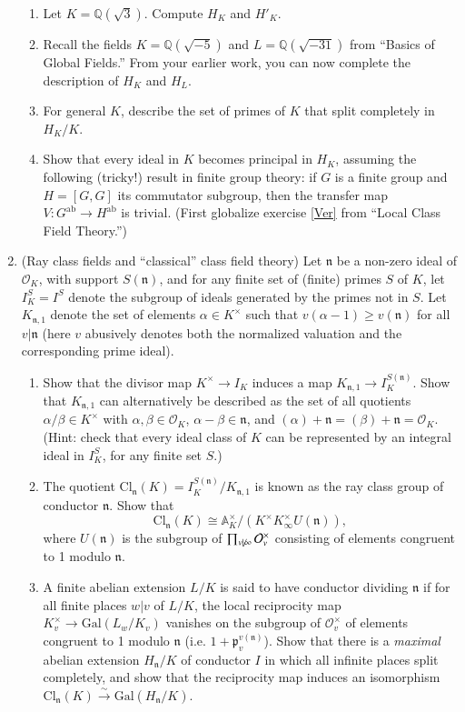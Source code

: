\documentclass[11pt,answers,addpoints,reqno]{exam}
\theoremstyle{definition}
\theoremstyle{remark}
\theoremstyle{definition}
\theoremstyle{remark}
\theoremstyle{remark}
\theoremstyle{remark}
\newcommand{\Q}{\mathbb{Q}}
\newcommand{\Gal}{\mathrm{Gal}} %
\newcommand{\mc}{\mathcal}
\newcommand{\mf}{\mathfrak}
\newcommand{\mr}{\mathrm}
\begin{document}
\begin{enumerate}
\begin{enumerate}
\item Let $K= \Q(\sqrt{3})$. Compute $H_K$ and $H'_K$.
\item Recall the fields $K= \Q(\sqrt{-5})$ and $L= \Q(\sqrt{-31})$ from ``Basics of Global Fields.'' From your earlier work, you can now complete the description of $H_K$ and $H_L$.
\item For general $K$, describe the set of primes of $K$ that split completely in $H_K/K$.
\item Show that every ideal in $K$ becomes principal in $H_K$, assuming the following (tricky!) result in finite group theory: if $G$ is a finite group and $H=[G, G]$ its commutator subgroup, then the transfer map $V \colon G^{\mr{ab}} \to H^{\mr{ab}}$ is trivial. (First globalize exercise \ref{Ver} from ``Local Class Field Theory.'')
\end{enumerate}
\item (Ray class fields and ``classical'' class field theory) Let $\mathfrak{n}$ be a non-zero ideal of $\mc{O}_K$, with support $S(\mf{n})$, and for any finite set of (finite) primes $S$ of $K$, let $I_K^{S}= I^{S}$ denote the subgroup of ideals generated by the primes not in $S$. Let $K_{\mf{n}, 1}$ denote the set of elements $\alpha \in K^{\times}$ such that $v(\alpha-1) \geq v(\mf{n})$ for all $v \vert \mf{n}$ (here $v$ abusively denotes both the normalized valuation and the corresponding prime ideal).
\begin{enumerate}
\item Show that the divisor map $K^{\times} \to I_K$ induces a map $K_{\mf{n}, 1} \to I_K^{S(\mf{n})}$. Show that $K_{\mf{n}, 1}$ can alternatively be described as the set of all quotients $\alpha/\beta \in K^{\times}$ with $\alpha, \beta \in \mc{O}_K$, $\alpha-\beta \in \mf{n}$, and $(\alpha)+\mf{n}= (\beta)+\mf{n}= \mc{O}_K$. (Hint: check that every ideal class of $K$ can be represented by an integral ideal in $I_K^S$, for any finite set $S$.)
\item The quotient $\mr{Cl}_{\mf{n}}(K)= I_K^{S(\mf{n})}/K_{\mf{n}, 1}$ is known as the ray class group of conductor $\mf{n}$. Show that
\[
 \mr{Cl}_{\mf{n}}(K) \cong \mathbb{A}_K^{\times}/(K^{\times}K_{\infty}^{\times}U(\mf{n})),
\]
where $U(\mf{n})$ is the subgroup of $\prod_{v \not \vert \infty} \mc{O}_{v}^{\times}$ consisting of elements congruent to 1 modulo $\mf{n}$.
\item A finite abelian extension $L/K$ is said to have conductor dividing $\mf{n}$ if for all finite places $w \vert v$ of $L/K$, the local reciprocity map $K_v^{\times} \to \Gal(L_w/K_v)$ vanishes on the subgroup of $\mc{O}_v^{\times}$ of elements congruent to 1 modulo $\mf{n}$ (i.e. $1+ \mf{p}_v^{v(\mf{n})}$). Show that there is a \textit{maximal} abelian extension $H_{\mf{n}}/K$ of conductor $I$ in which all infinite places split completely, and show that the reciprocity map induces an isomorphism $\mr{Cl}_{\mf{n}}(K) \xrightarrow{\sim} \Gal(H_{\mf{n}}/K)$.

\end{enumerate}
\end{enumerate}
\end{document}
